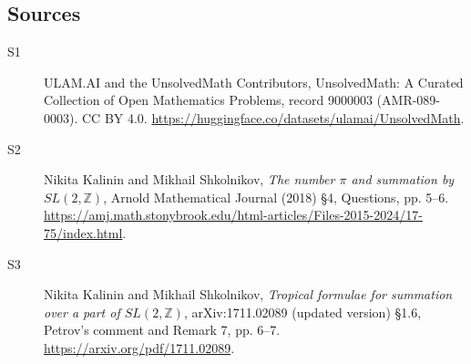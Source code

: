 \documentclass[11pt]{article}
\begin{document}
\subsection{Sources}
\begin{description}
\item[\hypertarget{source:9000003:1}{S1}] ULAM.AI and the UnsolvedMath Contributors, UnsolvedMath: A Curated Collection of Open Mathematics Problems, record 9000003 (AMR-089-0003). CC BY 4.0. \url{https://huggingface.co/datasets/ulamai/UnsolvedMath}.
\item[\hypertarget{source:9000003:2}{S2}] Nikita Kalinin and Mikhail Shkolnikov, \emph{The number $\pi$ and summation by $SL(2,\mathbb Z)$}, Arnold Mathematical Journal (2018) \S4, Questions, pp. 5--6. \url{https://amj.math.stonybrook.edu/html-articles/Files-2015-2024/17-75/index.html}.
\item[\hypertarget{source:9000003:3}{S3}] Nikita Kalinin and Mikhail Shkolnikov, \emph{Tropical formulae for summation over a part of $SL(2,\mathbb Z)$}, arXiv:1711.02089 (updated version) \S1.6, Petrov's comment and Remark 7, pp. 6--7. \url{https://arxiv.org/pdf/1711.02089}.
\end{description}
\label{end:9000003}
\end{document}
